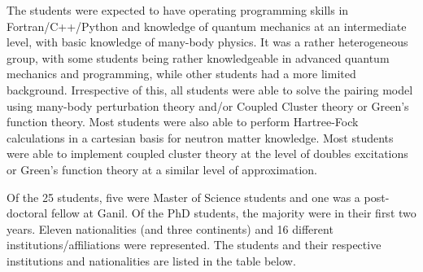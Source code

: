 \documentclass[prc,amsart,english]{revtex4}
\begin{document}
The students were expected to have operating programming skills in Fortran/C++/Python and knowledge of
quantum mechanics at an intermediate level, with basic knowledge of 
many-body physics. It was a rather heterogeneous group, with some students being rather knowledgeable in advanced quantum mechanics
and programming, while other students had a more limited background. Irrespective of this, all students were able to solve the pairing 
model using many-body perturbation theory and/or Coupled Cluster theory or Green's function theory. Most students were also able to 
perform Hartree-Fock calculations in a cartesian basis for neutron matter
knowledge.  Most students were able to implement coupled cluster theory at the level of doubles excitations or Green's function theory at a similar level of approximation. 

Of the 25 students, five were Master of Science students and one was a post-doctoral fellow at Ganil. Of the PhD students, the majority
were in their first two years. Eleven nationalities (and three continents) and 16 different institutions/affiliations 
were represented.
The students and their respective institutions and nationalities  are listed in the table below. 
\end{document}

